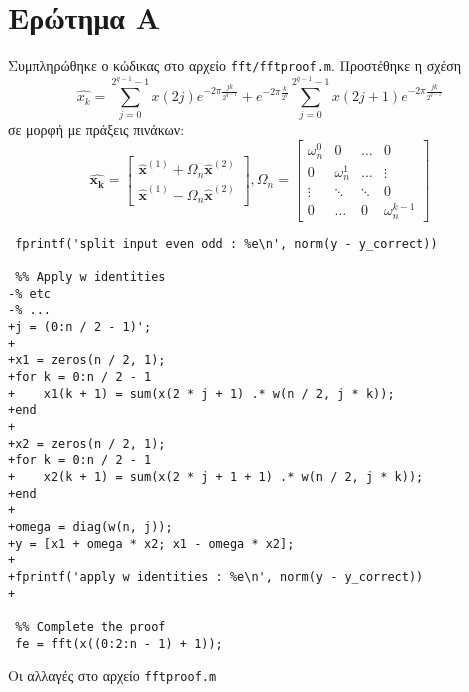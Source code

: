 \section{Ερώτημα Α}
Συμπληρώθηκε ο κώδικας στο αρχείο \texttt{fft/fftproof.m}.
Προστέθηκε η σχέση
\begin{equation}
\hat{x_k} = \sum\limits_{j=0}^{2^{q-1}-1}{x(2j)e^{-2\pi{}\frac{jk}{2^{q-1}}}} +
e^{-2\pi{}\frac{k}{2^q}}\sum\limits_{j=0}^{2^{q-1}-1}{x(2j+1)e^{-2\pi{}\frac{jk}{2^{q-1}}}}
\end{equation}
σε μορφή με πράξεις πινάκων:
\begin{equation}
\bm{\hat{x_k}} = \begin{bmatrix}
\bm{\hat{x}}^{(1)} + \Omega_n\bm{\hat{x}}^{(2)}\\
\bm{\hat{x}}^{(1)} - \Omega_n\bm{\hat{x}}^{(2)}
\end{bmatrix},
\Omega_n = \begin{bmatrix}
\omega_n^0 & 0 & \ldots & 0\\
0 & \omega_n^1 & \ldots & \vdots\\
\vdots & \ddots & \ddots & 0\\
0 & \ldots & 0 & \omega_n^{k-1}
\end{bmatrix}
\end{equation}

\begin{code}
\begin{verbatim}
 fprintf('split input even odd : %e\n', norm(y - y_correct))

 %% Apply w identities
-% etc
-% ...
+j = (0:n / 2 - 1)';
+
+x1 = zeros(n / 2, 1);
+for k = 0:n / 2 - 1
+    x1(k + 1) = sum(x(2 * j + 1) .* w(n / 2, j * k));
+end
+
+x2 = zeros(n / 2, 1);
+for k = 0:n / 2 - 1
+    x2(k + 1) = sum(x(2 * j + 1 + 1) .* w(n / 2, j * k));
+end
+
+omega = diag(w(n, j));
+y = [x1 + omega * x2; x1 - omega * x2];
+
+fprintf('apply w identities : %e\n', norm(y - y_correct))
+

 %% Complete the proof
 fe = fft(x((0:2:n - 1) + 1));
\end{verbatim}
\caption{Οι αλλαγές στο αρχείο \texttt{fftproof.m}}
\label{code:fftproof}
\end{code}
